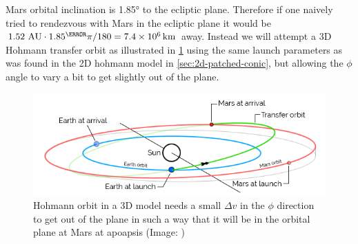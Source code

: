 Mars orbital inclination is \ang{1.85} to the ecliptic plane. Therefore if one naively tried to rendezvous with Mars in the ecliptic plane it would be \( 1.52\ \text{AU} \cdot 1.85^\degree \pi / 180 = \SI{7.4e6}{\km} \) away. Instead we will attempt a 3D Hohmann transfer orbit as illustrated in \cref{fig:hohmann-transfer-orbit-3D} using the same launch parameters as was found in the 2D hohmann model in \cref{sec:2d-patched-conic}, but allowing the \(\phi\) angle to vary a bit to get slightly out of the plane.

\begin{figure}[ht]
    \centering
    \includegraphics[width=0.90\linewidth]{fig/hohmann-transfer-orbit-3D.png}
    \caption{Hohmann orbit in a 3D model needs a small $\Delta v$ in the $\phi$ direction to get out of the plane in such a way that it will be in the orbital plane at Mars at apoapsis (Image: \cite{Daedalis.de})}
    \label{fig:hohmann-transfer-orbit-3D}
\end{figure}
 